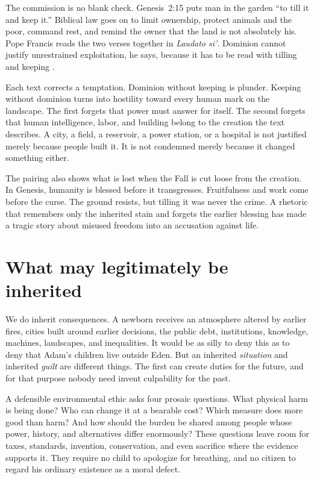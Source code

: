 \documentclass[12pt,a4paper]{book}
\begin{document}
The commission is no blank check. Genesis~2:15 puts man in the garden ``to till it and keep it.'' Biblical law goes on to limit ownership, protect animals and the poor, command rest, and remind the owner that the land is not absolutely his. Pope Francis reads the two verses together in \emph{Laudato si'}. Dominion cannot justify unrestrained exploitation, he says, because it has to be read with tilling and keeping \cite[para.~67]{FrancisLaudatoSi2015}.

Each text corrects a temptation. Dominion without keeping is plunder. Keeping without dominion turns into hostility toward every human mark on the landscape. The first forgets that power must answer for itself. The second forgets that human intelligence, labor, and building belong to the creation the text describes. A city, a field, a reservoir, a power station, or a hospital is not justified merely because people built it. It is not condemned merely because it changed something either.

The pairing also shows what is lost when the Fall is cut loose from the creation. In Genesis, humanity is blessed before it transgresses. Fruitfulness and work come before the curse. The ground resists, but tilling it was never the crime. A rhetoric that remembers only the inherited stain and forgets the earlier blessing has made a tragic story about misused freedom into an accusation against life.

\section{What may legitimately be inherited}

We do inherit consequences. A newborn receives an atmosphere altered by earlier fires, cities built around earlier decisions, the public debt, institutions, knowledge, machines, landscapes, and inequalities. It would be as silly to deny this as to deny that Adam's children live outside Eden. But an inherited \emph{situation} and inherited \emph{guilt} are different things. The first can create duties for the future, and for that purpose nobody need invent culpability for the past.

A defensible environmental ethic asks four prosaic questions. What physical harm is being done? Who can change it at a bearable cost? Which measure does more good than harm? And how should the burden be shared among people whose power, history, and alternatives differ enormously? These questions leave room for taxes, standards, invention, conservation, and even sacrifice where the evidence supports it. They require no child to apologize for breathing, and no citizen to regard his ordinary existence as a moral defect.
\end{document}
